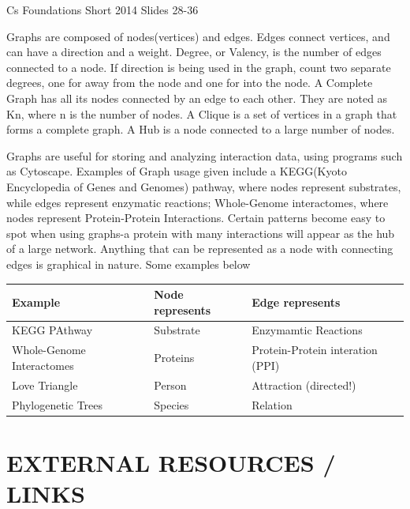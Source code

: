 \documentclass[11pt]{article}
\begin{document}
Cs Foundations Short 2014
Slides 28-36
	
Graphs are composed of nodes(vertices) and edges. Edges connect vertices, and can have a direction and a weight. Degree, or Valency, is the number of edges connected to a node. If direction is being used in the graph, count two separate degrees, one for away from the node and one for into the node. A Complete Graph has all its nodes connected by an edge to each other. They are noted as Kn, where n is the number of nodes. A Clique is a set of vertices in a graph that forms a complete graph. A Hub is a node connected to a large number of nodes.

Graphs are useful for storing and analyzing interaction data, using programs such as Cytoscape. Examples of Graph usage given include a KEGG(Kyoto Encyclopedia of Genes and Genomes) pathway, where nodes represent substrates, while edges represent enzymatic reactions; Whole-Genome interactomes, where nodes represent Protein-Protein Interactions. Certain patterns become easy to spot when using graphs-a protein with many interactions will appear as the hub of a large network. Anything that can be represented as a node with connecting edges is graphical in nature. Some examples below 

\begin{tabular}{| l | l | l |}
\hline
Example & Node represents & Edge represents \\ \hline
KEGG PAthway & Substrate & Enzymamtic Reactions \\ \hline
Whole-Genome Interactomes & Proteins & Protein-Protein interation (PPI) \\ \hline
Love Triangle & Person & Attraction (directed!) \\ \hline
Phylogenetic Trees & Species & Relation \\ \hline
\end{tabular}
\section*{EXTERNAL RESOURCES / LINKS}
\end{document}
